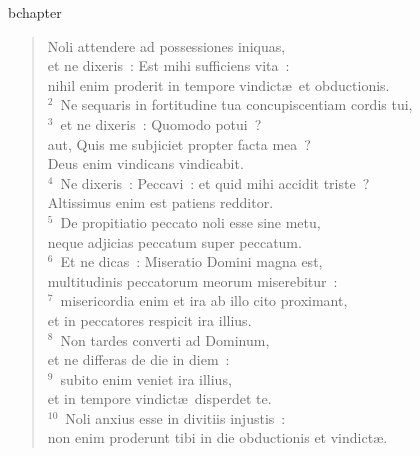 bchapter\begin{verse}\vspace{-19pt}Noli attendere ad possessiones iniquas,\\ et ne dixeris~: Est mihi sufficiens vita~:\\ nihil enim proderit in tempore vindict\ae\ et obductionis.\\
${}^{2}$~Ne sequaris in fortitudine tua concupiscentiam cordis tui,\\
${}^{3}$~et ne dixeris~: Quomodo potui~?\\ aut, Quis me subjiciet propter facta mea~?\\ Deus enim vindicans vindicabit.\\
${}^{4}$~Ne dixeris~: Peccavi~: et quid mihi accidit triste~?\\ Altissimus enim est patiens redditor.\\
${}^{5}$~De propitiatio peccato noli esse sine metu,\\ neque adjicias peccatum super peccatum.\\
${}^{6}$~Et ne dicas~: Miseratio Domini magna est,\\ multitudinis peccatorum meorum miserebitur~:\\
${}^{7}$~misericordia enim et ira ab illo cito proximant,\\ et in peccatores respicit ira illius.\\
${}^{8}$~Non tardes converti ad Dominum,\\ et ne differas de die in diem~:\\
${}^{9}$~subito enim veniet ira illius,\\ et in tempore vindict\ae\ disperdet te.\\
${}^{10}$~Noli anxius esse in divitiis injustis~:\\ non enim proderunt tibi in die obductionis et vindict\ae .\end{verse}


